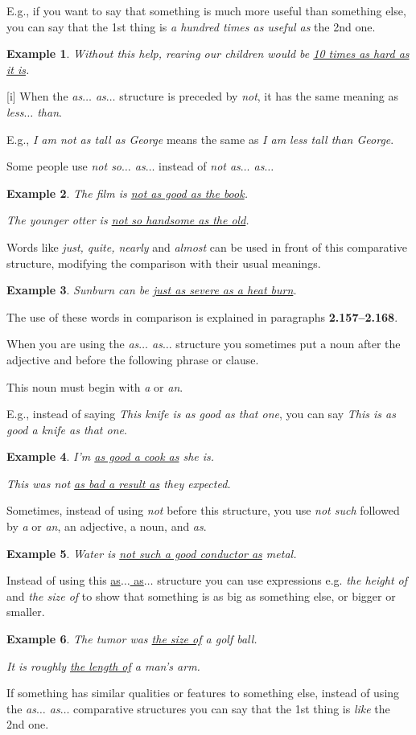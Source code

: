 \documentclass[oneside]{book}
\numberwithin{equation}{section}
\newtheorem{example}{Example}[section]
\begin{document}
E.g., if you want to say that something is much more useful than something else, you can say that the 1st thing is \textit{a hundred times as useful as} the 2nd one.
\begin{example}
    Without this help, rearing our children would be \underline{10 times as hard as it is}.
\end{example}
%
\noindent{} [i] When the \textit{as$\ldots$ as$\ldots$} structure is preceded by \textit{not}, it has the same meaning as \textit{less$\ldots$ than}.

E.g., \textit{I am not as tall as George} means the same as \textit{I am less tall than George}.

Some people use \textit{not so$\ldots$ as$\ldots$} instead of \textit{not as$\ldots$ as$\ldots$}
\begin{example}
    The film is \underline{not as good as the book}.
    
    The younger otter is \underline{not so handsome as the old}.
\end{example}
%
\noindent{} Words like \textit{just, quite, nearly} and \textit{almost} can be used in front of this comparative structure, modifying the comparison with their usual meanings.
\begin{example}
    Sunburn can be \underline{just as severe as a heat burn}.
\end{example}
The use of these words in comparison is explained in paragraphs \textbf{2.157--2.168}.

%
\noindent{} When you are using the \textit{as$\ldots$ as$\ldots$} structure you sometimes put a noun after the adjective and before the following phrase or clause.

This noun must begin with \textit{a} or \textit{an}.

E.g., instead of saying \textit{This knife is as good as that one}, you can say \textit{This is as good a knife as that one}.
\begin{example}
    I'm \underline{as good a cook as} she is.
    
    This was not \underline{as bad a result as} they expected.
\end{example}
Sometimes, instead of using \textit{not} before this structure, you use \textit{not such} followed by \textit{a} or \textit{an}, an adjective, a noun, and \textit{as}.
\begin{example}
    Water is \underline{not such a good conductor as} metal.
\end{example}
%
\noindent{} Instead of using this \underline{as$\ldots$ as$\ldots$} structure you can use expressions e.g. \textit{the height of} and \textit{the size of} to show that something is as big as something else, or bigger or smaller.
\begin{example}
    The tumor was \underline{the size of} a golf ball.
    
    It is roughly \underline{the length of} a man's arm.
\end{example} 
%
\noindent{} If something has similar qualities or features to something else, instead of using the \textit{as$\ldots$ as$\ldots$} comparative structures you can say that the 1st thing is \textit{like} the 2nd one.
\end{document}
